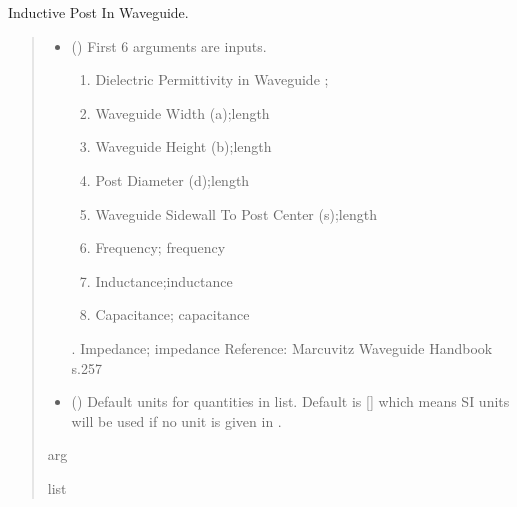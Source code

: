 \documentclass[letterpaper,10pt,english]{sphinxmanual}
\begin{document}
\begin{fulllineitems}
\label{\detokenize{components:components.InductivePostInWaveguide}}
\pysigstartsignatures
{}
\pysigstopsignatures
\sphinxAtStartPar
Inductive Post In Waveguide.
\begin{quote}\begin{description}
\begin{itemize}
\item {} 
\sphinxAtStartPar
{} () \textendash{} 
\sphinxAtStartPar
First 6 arguments are inputs.
\begin{enumerate}
%
\item {} 
\sphinxAtStartPar
Dielectric Permittivity in Waveguide ;

\item {} 
\sphinxAtStartPar
Waveguide Width (a);length

\item {} 
\sphinxAtStartPar
Waveguide Height (b);length

\item {} 
\sphinxAtStartPar
Post Diameter (d);length

\item {} 
\sphinxAtStartPar
Waveguide Sidewall To Post Center (s);length

\item {} 
\sphinxAtStartPar
Frequency; frequency

\item {} 
\sphinxAtStartPar
Inductance;inductance

\item {} 
\sphinxAtStartPar
Capacitance; capacitance

\end{enumerate}

. Impedance; impedance
Reference:  Marcuvitz Waveguide Handbook s.257


\item {} 
\sphinxAtStartPar
{} (\sphinxstyleliteralemphasis{\sphinxupquote{, }}) \textendash{} Default units for quantities in  list. Default is {[}{]} which means SI units will be used if no unit is given in .

\end{itemize}

\sphinxAtStartPar
arg

\sphinxAtStartPar
list

\end{description}\end{quote}

\end{fulllineitems}
\end{document}
